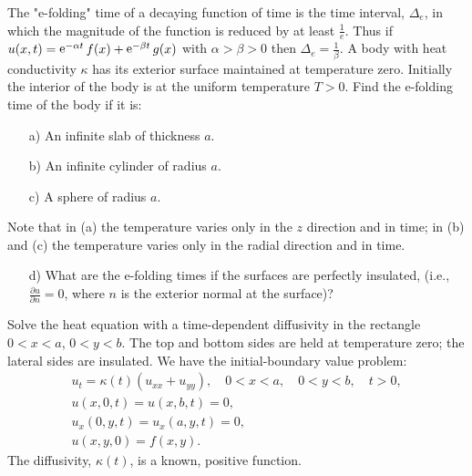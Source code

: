 {%
\begin{Exercise}
  \label{exercise e-folding time}
  The "e-folding" time of a decaying function of time is the time interval,
  $\Delta_e$, in which the magnitude of the function is reduced by at least
  $\frac{1}{e}$.  Thus if $u(x,t) = \mathop{\mathrm{e}}\nolimits^{-\alpha t} f(x) + \mathop{\mathrm{e}}\nolimits^{-\beta t} g(x)$
  with $\alpha > \beta > 0$ then $\Delta_e = \frac{1}{\beta}$.  A body
  with heat conductivity $\kappa$ has its exterior surface maintained at
  temperature zero.  Initially the interior of the body is at the uniform
  temperature $T > 0$.  Find the e-folding time of the body if it is:
  \begin{itemize}
  \item[a)]
    An infinite slab of thickness $a$.
  \item[b)]
    An infinite cylinder of radius $a$.
  \item[c)]
    A sphere of radius $a$.
  \end{itemize}
  Note that in (a) the temperature varies only in the $z$ direction and in time;
  in (b) and (c) the temperature varies only in the radial direction
  and in time.  

  \begin{itemize}
  \item[d)]
    What are the e-folding times if the surfaces are perfectly insulated, 
    (i.e., $\frac{\partial u}{\partial n} = 0$, where $n$ is the exterior normal at the 
    surface)? 
  \end{itemize}

\end{Exercise}





\begin{Exercise}
  \label{exercise heat rectangle non-constant diffusivity}
  Solve the heat equation with a time-dependent diffusivity in the rectangle
  $0 < x < a$, $0 < y < b$.  The top and bottom sides are held at temperature
  zero; the lateral sides are insulated.
  We have the initial-boundary value problem:
  \begin{gather*}
    u_t = \kappa(t) \left( u_{x x} + u_{y y} \right), \quad
    0 < x < a, \quad 0 < y < b, \quad t > 0, \\
    u(x,0,t) = u(x,b,t) = 0, \\
    u_x(0,y,t) = u_x(a,y,t) = 0, \\
    u(x,y,0) = f(x,y).
  \end{gather*}
  The diffusivity, $\kappa(t)$, is a known, positive function.


\end{Exercise}}
